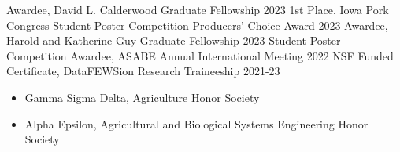 



\begin{cvhonors}

  \cvhonor
    {Awardee,} %
    {David L. Calderwood Graduate Fellowship} %
    { } %
    {2023} %
  \cvhonor
    {1st Place,} %
    {Iowa Pork Congress Student Poster Competition Producers' Choice Award} %
    { } %
    {2023} %
  \cvhonor
    {Awardee,} %
    {Harold and Katherine Guy Graduate Fellowship} %
    { } %
    {2023} %
  \cvhonor
    {Student Poster Competition Awardee,} %
    {ASABE Annual International Meeting} %
    { } %
    {2022} %
  \cvhonor
    {NSF Funded Certificate,} %
    {DataFEWSion Research Traineeship} %
    { } %
    {2021-23} %

\end{cvhonors}


\begin{cvparagraph}
\begin{itemize}
\item Gamma Sigma Delta, Agriculture Honor Society 
    
\item Alpha Epsilon, Agricultural and Biological Systems Engineering Honor Society 
\end{itemize}

\end{cvparagraph}